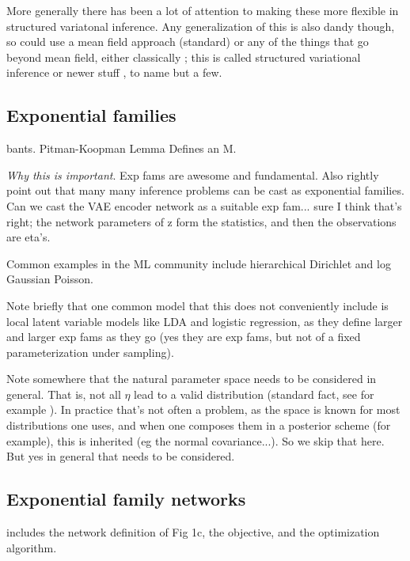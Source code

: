 \documentclass{article}
\begin{document}
 More generally there has been a lot of attention to making these more flexible in structured variatonal inference.  Any generalization of this is also dandy though, so could use a mean field approach (standard) or any of the things that go beyond mean field, either classically \cite{saul1996exploiting, barber1999tractable}; this is called structured variational inference or newer stuff  \cite{hoffman2015stochastic} \cite{tran2015copula}, to name but a few.


 \subsection{Exponential families}

bants.  Pitman-Koopman Lemma \cite[\S 3.3.3]{robert2007bayesian}  Defines an M.  

 \emph{Why this is important}. 
Exp fams are awesome and fundamental.  Also \cite{wainwright2008graphical} rightly point out that many many inference problems can be cast as exponential families.  Can we cast the VAE encoder network as a suitable exp fam... sure I think that's right; the network parameters of z form the statistics, and then the observations are eta's.  

Common examples in the ML community include hierarchical Dirichlet and log Gaussian Poisson.

Note briefly that one common model that this does not conveniently include is local latent variable models like LDA and logistic regression, as they define larger and larger exp fams as they go (yes they are exp fams, but not of a fixed parameterization under sampling).

 Note somewhere that the natural parameter space needs to be considered in general.  That is, not all $\eta$ lead to a valid distribution (standard fact, see for example \cite{wainwright2008graphical}).  In practice that's not often a problem, as the space is known for most distributions one uses, and when one composes them in a posterior scheme (for example), this is inherited (eg the normal covariance...).  So we skip that here.  But yes in general that needs to be considered.


 \subsection{Exponential family networks}

includes the network definition of Fig 1c, the objective, and the optimization algorithm.
 
\end{document}
